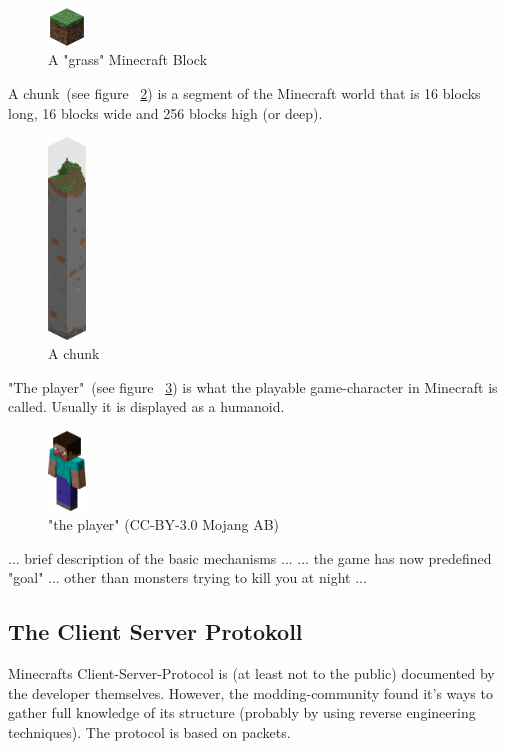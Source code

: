 \begin{figure}[h]
  \centering
    \includegraphics[width=1cm]{graphics/block}
  \caption{A "grass" Minecraft Block}
  \label{mc_block}
\end{figure}
        
A chunk~(see figure ~\ref{mc_chunk}) is a segment of the Minecraft world that is 16 blocks long, 16 blocks wide and 256 blocks high (or deep).~\cite{mcwiki_chunks}

\begin{figure}[h]
  \centering
    \includegraphics[width=1cm]{graphics/chunk}
  \caption{A chunk}
  \label{mc_chunk}
\end{figure}

"The player"~(see figure ~\ref{mc_player}) is what the playable game-character in Minecraft is called. Usually it is displayed as a humanoid.

\begin{figure}[h]
  \centering
    \includegraphics[width=1cm]{graphics/player}
  \caption{"the player" (CC-BY-3.0 Mojang AB) \cite{image_mob}}
  \label{mc_player}
\end{figure}

... brief description of the basic mechanisms ...
... the game has now predefined "goal" ... other than monsters trying to kill you at night ...

        \subsection{The Client Server Protokoll}
Minecrafts Client-Server-Protocol is (at least not to the public) documented by the developer themselves. However, the modding-community found it's ways to gather full knowledge of its structure (probably by using reverse engineering techniques). The protocol is based on packets. 

